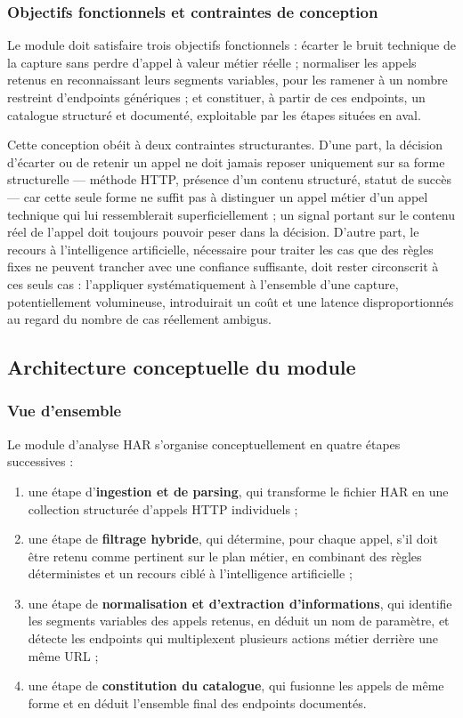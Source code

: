 \subsubsection{Objectifs fonctionnels et contraintes de conception}

Le module doit satisfaire trois objectifs fonctionnels : écarter le bruit technique de la capture sans perdre d'appel à valeur métier réelle ; normaliser les appels retenus en reconnaissant leurs segments variables, pour les ramener à un nombre restreint d'endpoints génériques ; et constituer, à partir de ces endpoints, un catalogue structuré et documenté, exploitable par les étapes situées en aval.

Cette conception obéit à deux contraintes structurantes. D'une part, la décision d'écarter ou de retenir un appel ne doit jamais reposer uniquement sur sa forme structurelle — méthode HTTP, présence d'un contenu structuré, statut de succès — car cette seule forme ne suffit pas à distinguer un appel métier d'un appel technique qui lui ressemblerait superficiellement ; un signal portant sur le contenu réel de l'appel doit toujours pouvoir peser dans la décision. D'autre part, le recours à l'intelligence artificielle, nécessaire pour traiter les cas que des règles fixes ne peuvent trancher avec une confiance suffisante, doit rester circonscrit à ces seuls cas : l'appliquer systématiquement à l'ensemble d'une capture, potentiellement volumineuse, introduirait un coût et une latence disproportionnés au regard du nombre de cas réellement ambigus.

\subsection{Architecture conceptuelle du module}

\subsubsection{Vue d'ensemble}

Le module d'analyse HAR s'organise conceptuellement en quatre étapes successives :

\begin{enumerate}
    \item une étape d'\textbf{ingestion et de parsing}, qui transforme le fichier HAR en une collection structurée d'appels HTTP individuels ;
    \item une étape de \textbf{filtrage hybride}, qui détermine, pour chaque appel, s'il doit être retenu comme pertinent sur le plan métier, en combinant des règles déterministes et un recours ciblé à l'intelligence artificielle ;
    \item une étape de \textbf{normalisation et d'extraction d'informations}, qui identifie les segments variables des appels retenus, en déduit un nom de paramètre, et détecte les endpoints qui multiplexent plusieurs actions métier derrière une même URL ;
    \item une étape de \textbf{constitution du catalogue}, qui fusionne les appels de même forme et en déduit l'ensemble final des endpoints documentés.
\end{enumerate}

